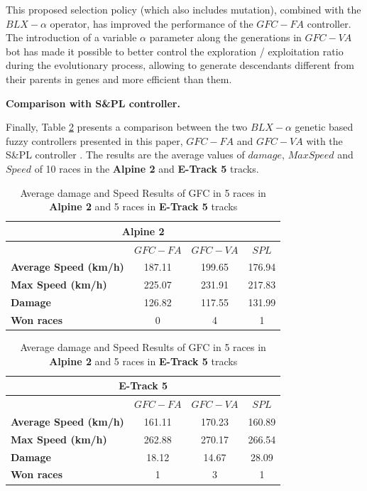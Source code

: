 \documentclass[conference]{IEEEtran}
\begin{document}
This proposed selection policy (which also includes mutation),
combined with the $BLX-\alpha$ operator, has improved the performance
of the $GFC-FA$ controller. 
The introduction of a variable $\alpha$ parameter along the
generations in $GFC-VA$ bot has made it possible to better control the
exploration / exploitation ratio during the evolutionary process,
allowing to generate descendants different from their parents in genes
and more efficient than them. 


\textbf{Comparison with S\&PL controller.}

Finally, Table \ref{tab:damagespeed} presents a comparison between the two $BLX-\alpha$ genetic based fuzzy controllers presented in this paper, \textbf{$GFC-FA$} and \textbf{$GFC-VA$} with the S\&PL controller \cite{PerezEvolvingFuzzy09}. The results are the average values of $damage$, $MaxSpeed$ and $Speed$ of 10 races in the \textbf{Alpine 2} and \textbf{E-Track 5} tracks. 

\begin{table}[!ht]
  \centering
  {\scriptsize
    \caption{Average damage and Speed Results of GFC in 5 races in \textbf{Alpine 2} and 5 races in \textbf{E-Track 5} tracks}
    \label{tab:damagespeed}
    \begin{tabular}{|p{1.65cm}|c|c|c|}
      \hline 
      \multicolumn{4}{|c|}{\textbf{Alpine 2}}  \\	
      \hline  
   & \textbf{$GFC-FA$}&\textbf{$GFC-VA$} & \textbf{$SPL$}\\					
      \hline \textbf{Average Speed (km/h)}& 187.11&199.65&176.94\\
      \hline \textbf{Max Speed (km/h)}& 225.07&231.91&217.83\\	
      \hline \textbf{Damage}& 126.82& 117.55&131.99 \\	
      \hline \textbf{Won races}&0&4&1\\	
      
      \hline 
    \end{tabular}
    \begin{tabular}{|p{1.65cm}|c|c|c|}
      \multicolumn{4}{|c|}{\textbf{E-Track 5}}  \\
      \hline 
& \textbf{$GFC-FA$}&\textbf{$GFC-VA$} & \textbf{$SPL$}\\				
      \hline \textbf{Average Speed (km/h)}& 161.11&170.23&160.89\\
      \hline \textbf{Max Speed  (km/h)}&262.88&270.17&266.54\\	
      \hline \textbf{Damage}&18.12& 14.67&28.09\\	 
      \hline \textbf{Won races}&1&3&1\\	
      \hline 
    \end{tabular}
	}
\end{table} 
\end{document}
